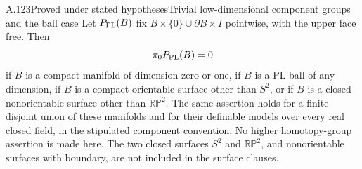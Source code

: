 \begin{saresult}{A.123}{Proved under stated hypotheses}{Trivial low-dimensional component groups and the ball case}
Let $P_{\rm PL}(B)$ fix $B\times\{0\}\cup\partial B\times I$
pointwise, with the upper face free. Then
\[
 \pi_0P_{\rm PL}(B)=0
\]
if $B$ is a compact manifold of dimension zero or one, if $B$ is
a PL ball of any dimension, if $B$ is a compact orientable
surface other than $S^2$, or if $B$ is a closed nonorientable
surface other than $\mathbb{RP}^2$. The same assertion holds for a finite
disjoint union of these manifolds and for their definable models
over every real closed field, in the stipulated component convention.
No higher homotopy-group assertion is made here. The two closed
surfaces $S^2$ and $\mathbb{RP}^2$, and nonorientable surfaces
with boundary, are not included in the surface clauses.
\end{saresult}
